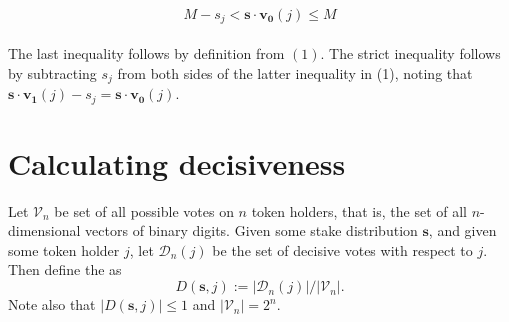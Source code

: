\documentclass[12pt]{article}
\begin{document}
\begin{equation}
    M - s_j < \mathbf{s}\cdot\mathbf{v_0}(j) \leq M
\end{equation}\\
The last inequality follows by definition from $(1)$. The strict inequality follows by subtracting $s_j$ from both sides of the latter inequality in (1), noting that $\mathbf{s}\cdot\mathbf{v_1}(j) - s_j = \mathbf{s}\cdot\mathbf{v_0}(j)$.


\section{Calculating decisiveness}

Let $\mathcal{V}_n$ be set of all possible votes on $n$ token holders, that is, the set of all $n$-dimensional vectors of binary digits. Given some stake distribution $\mathbf{s}$, and given some token holder $j$, let $\mathcal{D}_n(j)$ be the set of decisive votes with respect to $j$. Then define the  as $$D(\mathbf{s}, j) := |\mathcal{D}_n(j)|/|\mathcal{V}_n|.$$
Note also that $|D(\mathbf{s}, j)|\leq 1$ and $|\mathcal{V}_n| = 2^n$.
\end{document}

